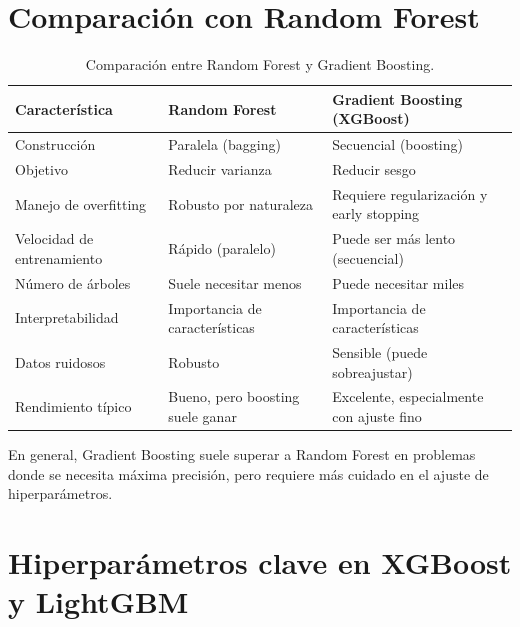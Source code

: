 \documentclass[12pt,a4paper,openany,oneside]{book}
\begin{document}
\section{Comparación con Random Forest}

\begin{table}[h]
\centering
\begin{tabular}{|l|l|l|}
\hline
\textbf{Característica} & \textbf{Random Forest} & \textbf{Gradient Boosting (XGBoost)} \\
\hline
Construcción & Paralela (bagging) & Secuencial (boosting) \\
Objetivo & Reducir varianza & Reducir sesgo \\
Manejo de overfitting & Robusto por naturaleza & Requiere regularización y early stopping \\
Velocidad de entrenamiento & Rápido (paralelo) & Puede ser más lento (secuencial) \\
Número de árboles & Suele necesitar menos & Puede necesitar miles \\
Interpretabilidad & Importancia de características & Importancia de características \\
Datos ruidosos & Robusto & Sensible (puede sobreajustar) \\
Rendimiento típico & Bueno, pero boosting suele ganar & Excelente, especialmente con ajuste fino \\
\hline
\end{tabular}
\caption{Comparación entre Random Forest y Gradient Boosting.}
\end{table}

En general, Gradient Boosting suele superar a Random Forest en problemas donde se necesita máxima precisión, pero requiere más cuidado en el ajuste de hiperparámetros.

\section{Hiperparámetros clave en XGBoost y LightGBM}
\end{document}
